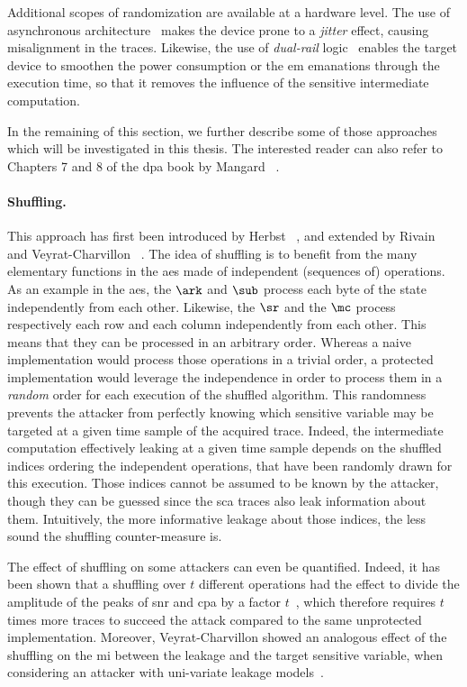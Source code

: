 Additional scopes of randomization are available at a hardware level.
The use of asynchronous architecture~\cite{renaudin_asynchronous_2000} makes the device prone to a \emph{jitter} effect, causing misalignment in the traces.
Likewise, the use of \emph{dual-rail} logic~\cite{suzuki_security_2006} enables the target device to smoothen the power consumption or the \gls{em} emanations through the execution time, so that it removes the influence of the sensitive intermediate computation.

In the remaining of this section, we further describe some of those approaches which will be investigated in this thesis.
The interested reader can also refer to Chapters 7 and 8 of the \gls{dpa} book by Mangard \etal{}~\cite{mangard_power_2007}.

\paragraph{Shuffling.}
This approach has first been introduced by Herbst \etal{}~\cite{herbst_aes_2006}, and extended by Rivain \etal{}~\cite{rivain_higher-order_2009} and Veyrat-Charvillon \etal{}~\cite{veyrat-charvillon_shuffling_2012}.
The idea of shuffling is to benefit from the many elementary functions in the \gls{aes} made of independent (sequences of) operations.
As an example in the \gls{aes}, the \(\ark\) and \(\sub\) process each byte of the state independently from each other.
Likewise, the \(\sr\) and the \(\mc\) process respectively each row and each column independently from each other.
This means that they can be processed in an arbitrary order.
Whereas a naive implementation would process those operations in a trivial order, a protected implementation would leverage the independence in order to process them in a \emph{random} order for each execution of the shuffled algorithm.
This randomness prevents the attacker from perfectly knowing which sensitive variable may be targeted at a given time sample of the acquired trace.
Indeed, the intermediate computation effectively leaking at a given time sample depends on the shuffled indices ordering the independent operations, that have been randomly drawn for this execution.
Those indices cannot be assumed to be known by the attacker, though they can be guessed since the \gls{sca} traces also leak information about them.
Intuitively, the more informative leakage about those indices, the less sound the shuffling counter-measure is.

The effect of shuffling on some attackers can even be quantified.
Indeed, it has been shown that a shuffling over \(t\) different operations had the effect to divide the amplitude of the peaks of \gls{snr} and \gls{cpa} by a factor \(t\)~\cite{clavier_differential_2000,mangard_hardware_2004}, which therefore requires \(t\) times more traces to succeed the attack compared to the same unprotected implementation.
Moreover, Veyrat-Charvillon \etal{} showed an analogous effect of the shuffling on the \gls{mi} between the leakage and the target sensitive variable, when considering an attacker with uni-variate leakage models~\cite{veyrat-charvillon_shuffling_2012}.

